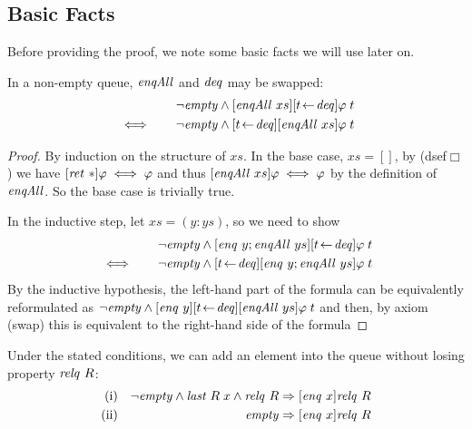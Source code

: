 \subsection{Basic Facts}
Before providing the proof, we note some basic facts we will use later on.
\begin{lem}
In a non-empty queue, $\mathit{enqAll}$ and $\mathit{deq}$ may be swapped:
\label{enqAll-deq}
\begin{eqnarray*}
&& \lnot \mathit{empty} \land [\mathit{enqAll}~xs][t\!\gets\!\mathit{deq}]\varphi\;t \\
&\iff \quad& \lnot \mathit{empty} \land [t\!\gets\!\mathit{deq}][\mathit{enqAll}~xs]\varphi\;t
\end{eqnarray*}
\end{lem}

\begin{proof}
By induction on the structure of $xs$. In the base case, $xs = []$, by
(dsef$\Box$) we have $[\mathit{ret}~\ast]\varphi \iff \varphi$ and thus $[\mathit{enqAll}~xs]\varphi \iff \varphi$
by the definition of $\mathit{enqAll}$. So the base case is trivially true.

In the inductive step, let $xs = (y: ys)$, so we need to show
\begin{eqnarray*}
&& \lnot \mathit{empty} \land [\mathit{enq}~y; \mathit{enqAll}~ys][t\!\gets\!\mathit{deq}]\varphi\;t \\
&\iff \quad& \lnot \mathit{empty} \land [t\!\gets\!\mathit{deq}][\mathit{enq}~y; \mathit{enqAll}~ys]\varphi\;t
\end{eqnarray*}
By the inductive hypothesis, the left-hand part of the formula can be
equivalently 
reformulated as $\lnot \mathit{empty}\land [\mathit{enq}~y][t\!\gets\!\mathit{deq}][\mathit{enqAll}~ys]\varphi\;t$ and then, by axiom
(swap) this is equivalent to the right-hand side of the formula
\end{proof}


\begin{lem}
\label{thm:enq-relq}
Under the stated conditions, we can add an element into the queue without
losing property $\mathit{relq}~R$:
\begin{eqnarray*}
\text{(i)} && \lnot \mathit{empty} \land \mathit{last}\; R\;x \land \mathit{relq}\  R \Rightarrow [\mathit{enq}~x]\mathit{relq}\  R \\
\text{(ii)} && \mathit{empty} \Rightarrow [\mathit{enq}~x]\mathit{relq}\  R
\end{eqnarray*}
\end{lem}

